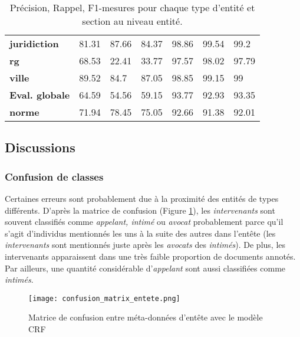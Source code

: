 \begin{table}[!h]
\begin{tabular}{|l|l|l|l|l|l|l|}
		\textbf{juridiction}   & 81.31              & 87.66           & 84.37       & 98.86              & 99.54           & 99.2        \\ 
		\textbf{rg}            & 68.53              & 22.41           & 33.77       & 97.57              & 98.02           & 97.79       \\ 
		\textbf{ville}         & 89.52              & 84.7            & 87.05       & 98.85              & 99.15           & 99          \\ \hline
		\textbf{Eval. globale} & 64.59              & 54.56           & 59.15       & 93.77              & 92.93           & 93.35       \\ \hline
				\noalign{\smallskip}\hline\noalign{\smallskip}
		\textbf{norme}         & 71.94              & 78.45           & 75.05       & 92.66              & 91.38           & 92.01       \\ \hline
	\end{tabular}
	\caption{Précision, Rappel, F1-mesures pour chaque type d'entité et section au niveau entité.}\label{tab:structuration:perf-detail-entity}
\end{table}

\subsection{Discussions}
\subsubsection{Confusion de classes}
Certaines erreurs sont probablement due à la proximité des entités de types différents. D'après la matrice de confusion (Figure \ref{fig:structuration:matrice-confusion-entete}), les \textit{intervenants} sont souvent classifiés comme \textit{appelant, intimé} ou \textit{avocat} probablement parce qu'il s'agit d'individus mentionnés les uns à la suite des autres dans l'entête (les \textit{intervenants} sont mentionnés juste après les \textit{avocats} des \textit{intimés}). De plus, les intervenants apparaissent dans une très faible proportion de documents annotés.  Par ailleurs, une quantité considérable d'\textit{appelant} sont aussi classifiées comme \textit{intimés}. 

\begin{figure}[h!]
    \centering
    \texttt{[image: confusion\_matrix\_entete.png]}
    \caption{Matrice de confusion entre méta-données d'entête avec le modèle CRF}
    \label{fig:structuration:matrice-confusion-entete}
\end{figure}

